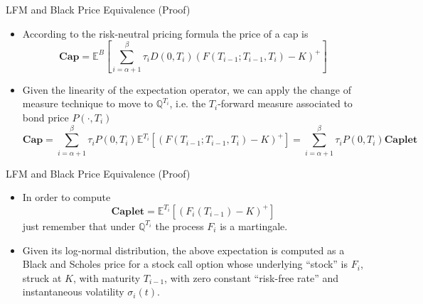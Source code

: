 \documentclass{beamer}
\begin{document}
\begin{frame}{LFM and Black Price Equivalence (Proof)}
	\begin{itemize}
		\item<1-> According to the risk-neutral pricing formula the price of a cap is
		\begin{equation*}
			\textbf{Cap}=\mathbb{E}^B\left[\sum_{i=\alpha+1}^\beta 	\tau_iD(0, T_i)(F(T_{i-1}; T_{i-1}, T_i) - K)^+\right]
		\end{equation*}
		\item<2-> Given the linearity of the expectation operator, we can apply the change of measure technique to move to $\mathbb{Q}^{T_i}$, i.e. the $T_i$-forward measure associated to bond price $P(\cdot,T_i)$
		\begin{equation*}
			\textbf{Cap}= \sum_{i=\alpha+1}^\beta \tau_i P(0, T_i)\mathbb{E}^{T_i}[(F(T_{i-1}; T_{i-1}, T_i) - K)^+] = \sum_{i=\alpha+1}^\beta \tau_i P(0, T_i)\textbf{Caplet}
		\end{equation*}
	\end{itemize}
\end{frame}

\begin{frame}{LFM and Black Price Equivalence (Proof)}
	\begin{itemize}
		\item In order to compute
		\begin{equation*}
			\textbf{Caplet} = \mathbb{E}^{T_i}[(F_i(T_{i-1}) - K)^+]
		\end{equation*}
		just remember that under $\mathbb{Q}^{T_i}$ the process $F_i$ is a martingale.
		\item Given its log-normal distribution, the above expectation is computed as \textcolor{maincolor}{a Black and Scholes price for a stock call option whose underlying “stock” is $F_i$, struck at $K$, with maturity $T_{i-1}$, with zero constant “risk-free rate” and instantaneous volatility $\sigma_i(t)$.}
	\end{itemize}
\end{frame}
\end{document}
